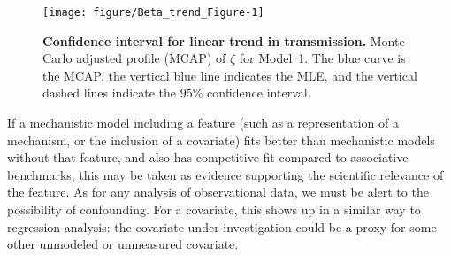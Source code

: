 \documentclass[10pt,letterpaper]{article}\usepackage[]{graphicx}\usepackage[table]{xcolor}
\makeatletter
\def\maxwidth{ %
  \ifdim\Gin@nat@width>\linewidth
    \linewidth
  \else
    \Gin@nat@width
  \fi
}
\newenvironment{knitrout}{}{} %
\newcommand\transmissionTrend{\zeta}
\newcommand\figTitle{\bf}
\makeatother
\begin{document}
\begin{figure}[!h]
\centering
\begin{knitrout}
\color{fgcolor}

{\centering \texttt{[image: figure/Beta\_trend\_Figure-1]} 

}


\end{knitrout}
\caption{\label{fig:betat}
{\figTitle Confidence interval for linear trend in transmission.}
Monte Carlo adjusted profile (MCAP) of $\transmissionTrend$ for Model~1.
The blue curve is the MCAP, the vertical blue line indicates the MLE, and the vertical dashed lines indicate the $95\%$ confidence interval.
}
\end{figure}



If a mechanistic model including a feature (such as a representation of a mechanism, or the inclusion of a covariate) fits better than mechanistic models without that feature, and also has competitive fit compared to associative benchmarks, this may be taken as evidence supporting the scientific relevance of the feature.
As for any analysis of observational data, we must be alert to the possibility of confounding.
For a covariate, this shows up in a similar way to regression analysis: the covariate under investigation could be a proxy for some other unmodeled  or unmeasured covariate.

\new{\editConfound}
\end{document}
